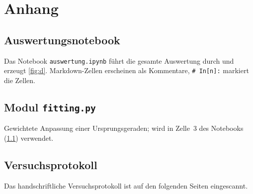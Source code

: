 \section{Anhang}

\subsection{Auswertungsnotebook}\label{sec:notebook}
Das Notebook \texttt{auswertung.ipynb} führt die gesamte Auswertung durch und
erzeugt \cref{fig:d}. Markdown-Zellen erscheinen als Kommentare,
\texttt{\# In[n]:} markiert die Zellen.

\subsection{Modul \texttt{fitting.py}}\label{sec:fitting}
Gewichtete Anpassung einer Ursprungsgeraden; wird in Zelle~3 des
Notebooks (\cref{sec:notebook}) verwendet.

\subsection{Versuchsprotokoll}\label{sec:protokoll}
Das handschriftliche Versuchsprotokoll ist auf den folgenden Seiten
eingescannt.

